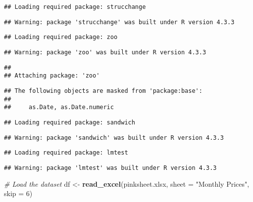 \documentclass[
]{article}
\newenvironment{Shaded}{\begin{snugshade}}{\end{snugshade}}
\newcommand{\AttributeTok}[1]{\textcolor[rgb]{0.13,0.29,0.53}{#1}}
\newcommand{\CommentTok}[1]{\textcolor[rgb]{0.56,0.35,0.01}{\textit{#1}}}
\newcommand{\DecValTok}[1]{\textcolor[rgb]{0.00,0.00,0.81}{#1}}
\newcommand{\FunctionTok}[1]{\textcolor[rgb]{0.13,0.29,0.53}{\textbf{#1}}}
\newcommand{\NormalTok}[1]{#1}
\newcommand{\OtherTok}[1]{\textcolor[rgb]{0.56,0.35,0.01}{#1}}
\newcommand{\StringTok}[1]{\textcolor[rgb]{0.31,0.60,0.02}{#1}}
\begin{document}
\begin{verbatim}
## Loading required package: strucchange
\end{verbatim}

\begin{verbatim}
## Warning: package 'strucchange' was built under R version 4.3.3
\end{verbatim}

\begin{verbatim}
## Loading required package: zoo
\end{verbatim}

\begin{verbatim}
## Warning: package 'zoo' was built under R version 4.3.3
\end{verbatim}

\begin{verbatim}
## 
## Attaching package: 'zoo'
\end{verbatim}

\begin{verbatim}
## The following objects are masked from 'package:base':
## 
##     as.Date, as.Date.numeric
\end{verbatim}

\begin{verbatim}
## Loading required package: sandwich
\end{verbatim}

\begin{verbatim}
## Warning: package 'sandwich' was built under R version 4.3.3
\end{verbatim}

\begin{verbatim}
## Loading required package: lmtest
\end{verbatim}

\begin{verbatim}
## Warning: package 'lmtest' was built under R version 4.3.3
\end{verbatim}

\begin{Shaded}
\begin{Highlighting}[]
\CommentTok{\# Load the dataset}
\NormalTok{df }\OtherTok{\textless{}{-}} \FunctionTok{read\_excel}\NormalTok{(}\StringTok{\textquotesingle{}pinksheet.xlsx\textquotesingle{}}\NormalTok{, }\AttributeTok{sheet =} \StringTok{"Monthly Prices"}\NormalTok{, }\AttributeTok{skip =} \DecValTok{6}\NormalTok{)}
\end{Highlighting}
\end{Shaded}
\end{document}
